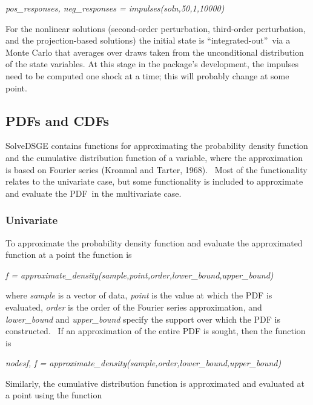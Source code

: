 \documentclass[notitlepage,11pt]{article}
\begin{document}
\textit{pos\_responses, neg\_responses = impulses(soln,50,1,10000)}

\bigskip

For the nonlinear solutions (second-order perturbation, third-order
perturbation, and the projection-based solutions) the initial state is
\textquotedblleft integrated-out\textquotedblright\ via a Monte Carlo that
averages over draws taken from the unconditional distribution of the state
variables. At this stage in the package's development, the impulses need to
be computed one shock at a time; this will probably change at some point.

\subsection{PDFs and CDFs}

SolveDSGE contains functions for approximating the probability density
function and the cumulative distribution function of a variable, where the
approximation is based on Fourier series (Kronmal and Tarter, 1968). \ Most
of the functionality relates to the univariate case, but some functionality
is included to approximate and evaluate the PDF\ in the multivariate case.

\subsubsection{Univariate}

To approximate the probability density function and evaluate the
approximated function at a point the function is

\bigskip

\textit{f =
approximate\_density(sample,point,order,lower\_bound,upper\_bound)}

\bigskip 

where \textit{sample} is a vector of data, \textit{point} is the value at
which the PDF is evaluated, \textit{order} is the order of the Fourier
series approximation, and \textit{lower\_bound} and \textit{upper\_bound}
specify the support over which the PDF is constructed. \ If an approximation
of the entire PDF is sought, then the function is

\bigskip

\textit{nodesf, f =
approximate\_density(sample,order,lower\_bound,upper\_bound)}

\bigskip

Similarly, the cumulative distribution function is approximated and
evaluated at a point using the function
\end{document}
